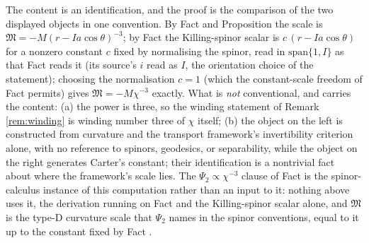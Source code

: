 The content is an identification, and the proof is the comparison of the two displayed objects in one convention. By Fact  and Proposition  the scale is $\mathfrak M = -M(r - Ia\cos\theta)^{-3}$; by Fact  the Killing-spinor scalar is $c\,(r - Ia\cos\theta)$ for a nonzero constant $c$ fixed by normalising the spinor, read in $\mathrm{span}\{1, I\}$ as that Fact reads it (its source's $i$ read as $I$, the orientation choice of the statement); choosing the normalisation $c = 1$ (which the constant-scale freedom of Fact  permits) gives $\mathfrak M = -M\chi^{-3}$ exactly. What is \emph{not} conventional, and carries the content: (a) the power is three, so the winding statement of Remark \ref{rem:winding} is winding number three of $\chi$ itself; (b) the object on the left is constructed from curvature and the transport framework's invertibility criterion alone, with no reference to spinors, geodesics, or separability, while the object on the right generates Carter's constant; their identification is a nontrivial fact about where the framework's scale lies. The $\Psi_2 \propto \chi^{-3}$ clause of Fact  is the spinor-calculus instance of this computation rather than an input to it: nothing above uses it, the derivation running on Fact  and the Killing-spinor scalar alone, and $\mathfrak M$ is the type-D curvature scale that $\Psi_2$ names in the spinor conventions, equal to it up to the constant fixed by Fact .
